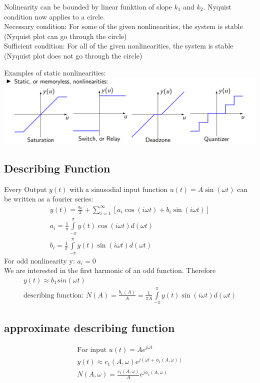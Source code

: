 Nolinearity can be bounded by linear funktion of slope $k_1$ and $k_2$. Nyquist condition now applies to a circle.\\
Necessary condition: For some of the given nonlinearities, the system is stable (Nyquist plot can go through the circle)\\
Sufficient condition: For all of the given nonlinearities, the system is stable (Nyquist plot does not go through the circle)

Examples of static nonlinearities:\\
\includegraphics[width = \linewidth]{src/images/nonlinearity_example.png}

\subsection{Describing Function}
    Every Output $y(t)$ with a sinusodial input function $u(t) = A \sin(\omega t)$ can be written as a fourier series:
    \begin{align*}
        y(t) = \frac{a_0}{2} + \sum\limits_{i = 1}^{\infty}[a_i \cos(i \omega t) + b_i \sin(i \omega t)]\\
        a_i = \frac{1}{\pi} \int\limits_{-\pi}^{\pi} y(t) \cos(i \omega t) d(\omega t)\\
        b_i = \frac{1}{\pi} \int\limits_{-\pi}^{\pi} y(t) \sin(i \omega t) d(\omega t)
    \end{align*}
    For odd nonlinearity y: $a_i = 0$\\
    We are interested in the first harmonic of an odd function. Therefore 
    \begin{align*}
        y(t) \approx b_1 sin(\omega t)\\
        \text{describing function: } N(A) = \frac{b_1(A)}{A} = \frac{1}{\pi A} \int\limits_{-\pi}^{\pi} y(t) \sin(i \omega t) d(\omega t)
    \end{align*}

\subsection{approximate describing function}
    \begin{align*}
        \text{For input } u(t) = Ae^{j \omega t}\\
        y(t) \approx c_1(A, \omega) e^{j(\omega t + \phi_1(A, \omega))}\\
        N(A, \omega) = \frac{c_1(A, \omega)}{A} e^{j \phi_1(A, \omega)}
    \end{align*}

